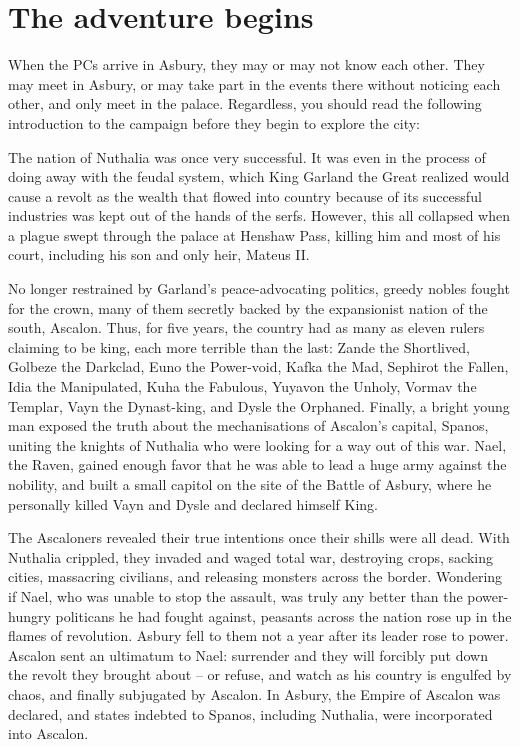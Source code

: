 \documentclass{report}
\theoremstyle{definition}
\begin{document}
\section{The adventure begins}
When the PCs arrive in Asbury, they may or may not know each other.  They may meet in Asbury, or may take part in the events there without noticing each other, and only meet in the palace. Regardless, you should read the following introduction to the campaign before they begin to explore the city:
\begin{displayquote}The nation of Nuthalia was once very successful. It was even in the process of doing away with the feudal system, which King Garland the Great realized would cause a revolt as the wealth that flowed into country because of its successful industries was kept out of the hands of the serfs. However, this all collapsed when a plague swept through the palace at Henshaw Pass, killing him and most of his court, including his son and only heir, Mateus II. 

No longer restrained by Garland's peace-advocating politics, greedy nobles fought for the crown, many of them secretly backed by the expansionist nation of the south, Ascalon. Thus, for five years, the country had as many as eleven rulers claiming to be king, each more terrible than the last: Zande the Shortlived, Golbeze the Darkclad, Euno the Power-void, Kafka the Mad, Sephirot the Fallen, Idia the Manipulated, Kuha the Fabulous, Yuyavon the Unholy, Vormav the Templar, Vayn the Dynast-king, and Dysle the Orphaned. Finally, a bright young man exposed the truth about the mechanisations of Ascalon's capital, Spanos, uniting the knights of Nuthalia who were looking for a way out of this war. Nael, the Raven, gained enough favor that he was able to lead a huge army against the nobility, and built a small capitol on the site of the Battle of Asbury, where he personally killed Vayn and Dysle and declared himself King. 

The Ascaloners revealed their true intentions once their shills were all dead. With Nuthalia crippled, they invaded and waged total war, destroying crops, sacking cities, massacring civilians, and releasing monsters across the border. Wondering if Nael, who was unable to stop the assault, was truly any better than the power-hungry politicans he had fought against, peasants across the nation rose up in the flames of revolution. Asbury fell to them not a year after its leader rose to power. Ascalon sent an ultimatum to Nael: surrender and they will forcibly put down the revolt they brought about -- or refuse, and watch as his country is engulfed by chaos, and finally subjugated by Ascalon. In Asbury, the Empire of Ascalon was declared, and states indebted to Spanos, including Nuthalia, were incorporated into Ascalon.


\end{displayquote}
\end{document}

